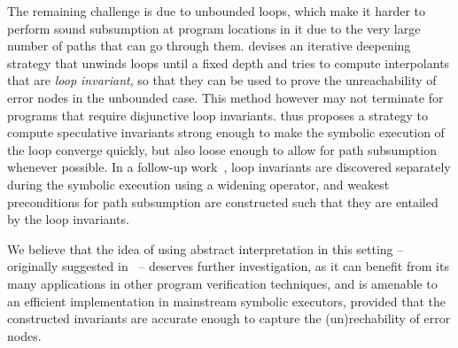 {
The remaining challenge is due to unbounded loops, which make it harder to perform sound subsumption at program locations in it due to the very large number of paths that can go through them. \cite{McMillan10} devises an iterative deepening strategy that unwinds loops until a fixed depth and tries to compute interpolants that are {\em loop invariant}, so that they can be used to prove the unreachability of error nodes in the unbounded case. This method however may not terminate for programs that require disjunctive loop invariants. \cite{JNS11} thus proposes a strategy to compute speculative invariants strong enough to make the symbolic execution of the loop converge quickly, but also loose enough to allow for path subsumption whenever possible. In a follow-up work~\cite{JMN12}, loop invariants are discovered separately during the symbolic execution using a widening operator, and weakest preconditions for path subsumption are constructed such that they are entailed by the loop invariants.

We believe that the idea of using abstract interpretation in this setting -- originally suggested in~\cite{JSV09} -- deserves further investigation, as it can benefit from its many applications in other program verification techniques, and is amenable to an efficient implementation in mainstream symbolic executors, provided that the constructed invariants are accurate enough to capture the (un)rechability of error nodes.

}



